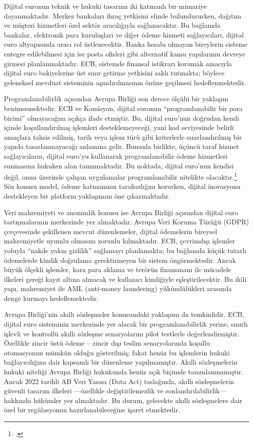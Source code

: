 \documentclass[a4paper,12pt]{article}
\begin{document}
Dijital euronun teknik ve hukuki tasarımı iki katmanlı bir mimariye dayanmaktadır. Merkez bankaları ihraç yetkisini elinde bulundururken, dağıtım ve müşteri hizmetleri özel sektör aracılığıyla sağlanacaktır. Bu bağlamda bankalar, elektronik para kuruluşları ve diğer ödeme hizmeti sağlayıcıları, dijital euro altyapısında aracı rol üstlenecektir. Banka hesabı olmayan bireylerin sisteme entegre edilebilmesi için ise posta ofisleri gibi alternatif kamu yapılarının devreye girmesi planlanmaktadır. ECB, sistemde finansal istikrarı korumak amacıyla dijital euro bakiyelerine üst sınır getirme yetkisini saklı tutmakta; böylece geleneksel mevduat sisteminin aşındırılmasının önüne geçilmesi hedeflenmektedir.

Programlanabilirlik açısından Avrupa Birliği son derece ölçülü bir yaklaşım benimsemektedir. ECB ve Komisyon, dijital euronun “programlanabilir bir para birimi” olmayacağını açıkça ifade etmiştir. Bu, dijital euro'nun doğrudan kendi içinde koşullandırılmış işlemleri desteklemeyeceği, yani kod seviyesinde belirli amaçlara tahsis edilmiş, tarih veya işlem türü gibi kriterlerle sınırlandırılmış bir yapıda tasarlanmayacağı anlamına gelir. Bununla birlikte, üçüncü taraf hizmet sağlayıcıların, dijital euro’yu kullanarak programlanabilir ödeme hizmetleri sunmasına hukuken alan tanınmaktadır. Bu noktada, dijital euro’nun kendisi değil, onun üzerinde çalışan uygulamalar programlanabilir nitelikte olacaktır.\footcite{ecb2023design} Söz konusu model, ödeme katmanının tarafsızlığını korurken, dijital inovasyonu destekleyen bir platform yaklaşımını öne çıkarmaktadır.

Veri mahremiyeti ve anonimlik konusu ise Avrupa Birliği açısından dijital euro tartışmalarının merkezinde yer almaktadır. Avrupa Veri Koruma Tüzüğü (GDPR) çerçevesinde şekillenen mevcut düzenlemeler, dijital ödemelerin bireysel mahremiyetle uyumlu olmasını zorunlu kılmaktadır. ECB, çevrimdışı işlemler yoluyla “nakde yakın gizlilik” sağlamayı planlamakta; bu bağlamda küçük tutarlı ödemelerde kimlik doğrulama gerektirmeyen bir sistem öngörmektedir. Ancak büyük ölçekli işlemler, kara para aklama ve terörün finansmanı ile mücadele ilkeleri gereği kayıt altına alınacak ve kullanıcı kimliğiyle eşleştirilecektir. Bu ikili yapı, mahremiyet ile AML (anti-money laundering) yükümlülükleri arasında denge kurmayı hedeflemektedir.

Avrupa Birliği'nin akıllı sözleşmeler konusundaki yaklaşımı da temkinlidir. ECB, dijital euro sisteminin merkezinde yer alacak bir programlanabilirlik yerine, sınırlı işlevli ve kontrollü akıllı sözleşme senaryolarını pilot testlerle değerlendirmiştir. Özellikle zincir üstü ödeme – zincir dışı teslim senaryolarında koşullu otomasyonun mümkün olduğu gösterilmiş; fakat henüz bu işlemlerin hukuki bağlayıcılığına dair kapsamlı bir düzenleme yapılmamıştır. Akıllı sözleşmelerin hukuki niteliği Avrupa Birliği hukukunda henüz açık biçimde tanımlanmamıştır. Ancak 2022 tarihli AB Veri Yasası (Data Act) taslağında, akıllı sözleşmelerin güvenli tasarım ilkeleri —özellikle değiştirilemezlik ve sonlandırılabilirlik— hakkında hükümler yer almaktadır. Bu durum, gelecekte akıllı sözleşmelere dair özel bir regülasyonun hazırlanabileceğine işaret etmektedir.
\end{document}
